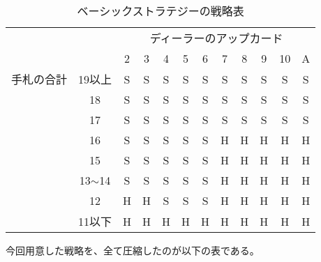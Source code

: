 \begin{table}[H]
\caption{ベーシックストラテジーの戦略表}
\label{table:data_type}
\begin{center}
\begin{tabular}{|cc|c|c|c|c|c|c|c|c|c|c|}
\hline
                            &            & \multicolumn{10}{c|}{ディーラーのアップカード}     \\ \cline{3-12} 
                            &            & 2 & 3 & 4 & 5 & 6 & 7 & 8 & 9 & 10 & A \\ \hline
\multicolumn{1}{|l|}{手札の合計} & 19以上       & S & S & S & S & S & S & S & S & S  & S \\ \cline{2-12} 
\multicolumn{1}{|l|}{}      & 18         & S & S & S & S & S & S & S & S & S  & S \\ \cline{2-12} 
\multicolumn{1}{|l|}{}      & 17         & S & S & S & S & S & S & S & S & S  & S \\ \cline{2-12} 
\multicolumn{1}{|l|}{}      & 16         & S & S & S & S & S & H & H & H & H  & H \\ \cline{2-12} 
\multicolumn{1}{|l|}{}      & 15         & S & S & S & S & S & H & H & H & H  & H \\ \cline{2-12} 
\multicolumn{1}{|l|}{}      & 13$\sim$14 & S & S & S & S & S & H & H & H & H  & H \\ \cline{2-12} 
\multicolumn{1}{|l|}{}      & 12         & H & H & S & S & S & H & H & H & H  & H \\ \cline{2-12} 
\multicolumn{1}{|l|}{}      & 11以下       & H & H & H & H & H & H & H & H & H  & H \\ \hline
\end{tabular}
\end{center}
\end{table}

今回用意した戦略を、全て圧縮したのが以下の表である。




